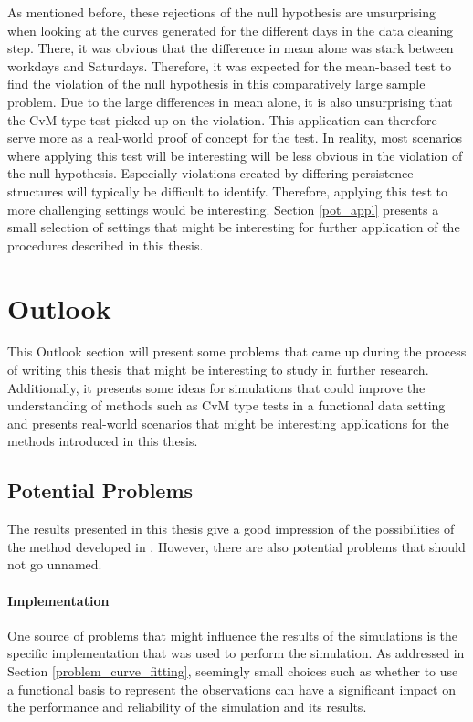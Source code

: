 \documentclass[12pt, a4paper]{article}
\theoremstyle{MAstyle} \newtheorem{assumption}{Assumption}[section]
\theoremstyle{MAstyle} \newtheorem{definition}{Definition}[section]
\theoremstyle{MAstyle} \newtheorem{theorem}{Theorem}[section]
\begin{document}
			As mentioned before, these rejections of the null hypothesis are unsurprising when looking at the curves generated for the different days in the data cleaning step. There, it was obvious that the difference in mean alone was stark between workdays and Saturdays. Therefore, it was expected for the mean-based test to find the violation of the null hypothesis in this comparatively large sample problem. Due to the large differences in mean alone, it is also unsurprising that the CvM type test picked up on the violation.
			This application can therefore serve more as a real-world proof of concept for the test. In reality, most scenarios where applying this test will be interesting will be less obvious in the violation of the null hypothesis. Especially violations created by differing persistence structures will typically be difficult to identify. Therefore, applying this test to more challenging settings would be interesting. Section \ref{pot_appl} presents a small selection of settings that might be interesting for further application of the procedures described in this thesis.
	
	\section{Outlook}\label{Outlook}
		This Outlook section will present some problems that came up during the process of writing this thesis that might be interesting to study in further research. Additionally, it presents some ideas for simulations that could improve the understanding of methods such as CvM type tests in a functional data setting and presents real-world scenarios that might be interesting applications for the methods introduced in this thesis.
		
		\subsection{Potential Problems}
			The results presented in this thesis give a good impression of the possibilities of the method developed in \cite{bugni_permutation_2021}. However, there are also potential problems that should not go unnamed.
			
			\paragraph{Implementation\\}
				One source of problems that might influence the results of the simulations is the specific implementation that was used to perform the simulation. As addressed in Section \ref{problem_curve_fitting}, seemingly small choices such as whether to use a functional basis to represent the observations can have a significant impact on the performance and reliability of the simulation and its results.
				
\end{document}
